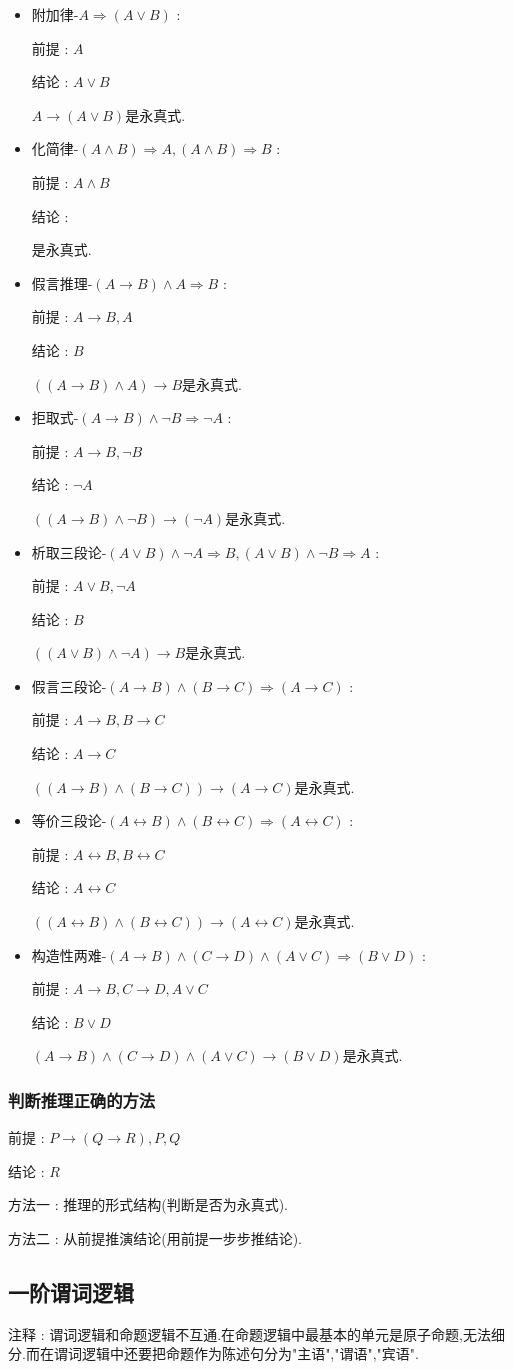 \documentclass[UTF8,12pt]{ctexbook}
\newcommand{\reasoningStructure}[5]{
      {#1}-{#2} : 
      
      前提 : {#3}
      
      结论 : {#4}
      
      {#5}是永真式.
      }
\begin{document}
{{{{{    \begin{itemize}
      \item \reasoningStructure{附加律}{$A \Rightarrow (A \lor B)$}{$A$}{$A \lor B$}{$A \to (A \lor B)$}
      \item \reasoningStructure{化简律}{$(A \land B) \Rightarrow A,(A \land B) \Rightarrow B$}{$A \land B$}{}{}
      \item \reasoningStructure{假言推理}{$(A \to B) \land A \Rightarrow B$}{$A \to B,A$}{$B$}{$((A \to B) \land A) \to B$}
      \item \reasoningStructure{拒取式}{$(A \to B) \land \lnot B \Rightarrow \lnot A$}{$A \to B,\lnot B$}{$\lnot A$}{$((A \to B) \land \lnot B) \to (\lnot A)$}
      \item \reasoningStructure{析取三段论}{$(A \lor B) \land \lnot A \Rightarrow B,(A \lor B) \land \lnot B \Rightarrow A$}{$A \lor B,\lnot A$}{$B$}{$((A \lor B)\land \lnot A) \to B$}
      \item \reasoningStructure{假言三段论}{$(A \to B) \land (B \to C) \Rightarrow (A \to C)$}{$A \to B,B \to C$}{$A \to C$}{$((A \to B) \land (B \to C)) \to (A \to C)$}
      \item \reasoningStructure{等价三段论}{$(A \longleftrightarrow B) \land (B \longleftrightarrow C) \Rightarrow (A \longleftrightarrow C)$}{$A \longleftrightarrow B,B \longleftrightarrow C$}{$A \longleftrightarrow C$}{$((A \longleftrightarrow B) \land (B \longleftrightarrow C)) \to (A \longleftrightarrow C)$}
      \item \reasoningStructure{构造性两难}{$(A \to B) \land (C \to D) \land (A \lor C) \Rightarrow (B \lor D)$}{$A \to B,C \to D,A \lor C$}{$B \lor D$}{$(A \to B) \land (C \to D) \land (A \lor C) \to (B \lor D)$}
    \end{itemize}
  }%

  \subsubsection{判断推理正确的方法}{
    前提 : $P \to (Q \to R),P,Q$

    结论 : $R$

    方法一 : 推理的形式结构(判断是否为永真式).

    方法二 : 从前提推演结论(用前提一步步推结论).
  }%

}%

\subsection{一阶谓词逻辑}{
  注释 : 谓词逻辑和命题逻辑不互通.在命题逻辑中最基本的单元是原子命题,无法细分.而在谓词逻辑中还要把命题作为陈述句分为"主语","谓语","宾语".

}}}}
\end{document}

